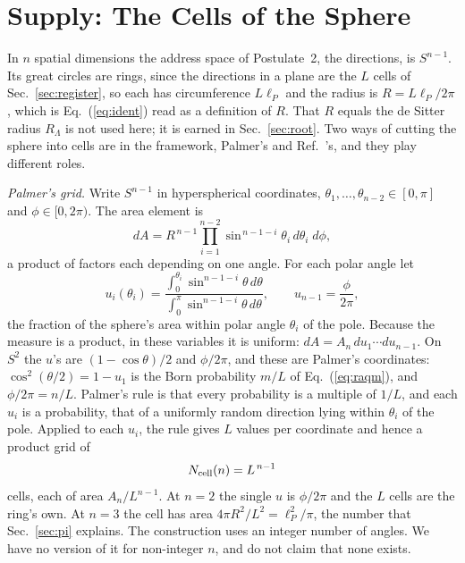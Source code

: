 \documentclass[aps,prd,twocolumn,superscriptaddress,nofootinbib]{revtex4-2}
\begin{document}
\section{Supply: The Cells of the Sphere}
\label{sec:supply}

In $n$ spatial dimensions the address space of Postulate~2, the directions, is $S^{n-1}$. Its great circles are rings, since the directions in a plane are the $L$ cells of Sec.~\ref{sec:register}, so each has circumference $L\ell_P$ and the radius is $R = L\ell_P/2\pi$, which is Eq.~(\ref{eq:ident}) read as a definition of $R$. That $R$ equals the de Sitter radius $R_\Lambda$ is not used here; it is earned in Sec.~\ref{sec:root}. Two ways of cutting the sphere into cells are in the framework, Palmer's and Ref.~\cite{korytko2026}'s, and they play different roles.

\textit{Palmer's grid.} Write $S^{n-1}$ in hyperspherical coordinates, $\theta_1,\dots,\theta_{n-2}\in[0,\pi]$ and $\phi\in[0,2\pi)$. The area element is
\begin{equation}
dA = R^{\,n-1}\prod_{i=1}^{n-2}\sin^{\,n-1-i}\theta_i\,d\theta_i\;d\phi,
\label{eq:dA}
\end{equation}
a product of factors each depending on one angle. For each polar angle let
\begin{equation}
u_i(\theta_i) = \frac{\int_0^{\theta_i}\sin^{n-1-i}\theta\,d\theta}{\int_0^{\pi}\sin^{n-1-i}\theta\,d\theta},\qquad u_{n-1} = \frac{\phi}{2\pi},
\label{eq:u}
\end{equation}
the fraction of the sphere's area within polar angle $\theta_i$ of the pole. Because the measure is a product, in these variables it is uniform: $dA = A_n\,du_1\cdots du_{n-1}$. On $S^2$ the $u$'s are $(1-\cos\theta)/2$ and $\phi/2\pi$, and these are Palmer's coordinates: $\cos^2(\theta/2) = 1 - u_1$ is the Born probability $m/L$ of Eq.~(\ref{eq:raqm}), and $\phi/2\pi = n/L$. Palmer's rule is that every probability is a multiple of $1/L$, and each $u_i$ is a probability, that of a uniformly random direction lying within $\theta_i$ of the pole. Applied to each $u_i$, the rule gives $L$ values per coordinate and hence a product grid of
\begin{equation}
N_{\rm cell}(n) = L^{\,n-1}
\label{eq:cells}
\end{equation}
cells, each of area $A_n/L^{n-1}$. At $n=2$ the single $u$ is $\phi/2\pi$ and the $L$ cells are the ring's own. At $n=3$ the cell has area $4\pi R^2/L^2 = \ell_P^2/\pi$, the number that Sec.~\ref{sec:pi} explains. The construction uses an integer number of angles. We have no version of it for non-integer $n$, and do not claim that none exists.
\end{document}
